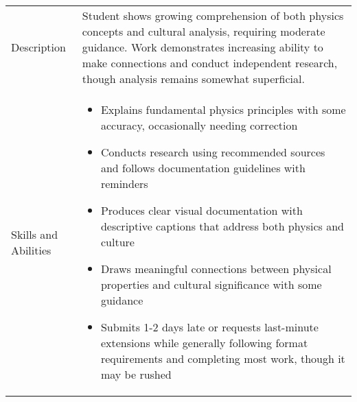 \documentclass[12pt]{article}
\begin{document}
\begin{table}[b]
\renewcommand{\arraystretch}{1.5}
\begin{tabular}{>{\raggedright\arraybackslash}p{2cm}|>{\raggedright\arraybackslash}p{14cm}}
\toprule
\multicolumn{2}{l}{\textbf{Developing}} \\
\midrule
Description & Student shows growing comprehension of both physics concepts and cultural analysis, requiring moderate guidance. Work demonstrates increasing ability to make connections and conduct independent research, though analysis remains somewhat superficial. \\
\midrule
Skills and Abilities & 
\begin{itemize}
    \item Explains fundamental physics principles with some accuracy, occasionally needing correction
    \item Conducts research using recommended sources and follows documentation guidelines with reminders
    \item Produces clear visual documentation with descriptive captions that address both physics and culture
    \item Draws meaningful connections between physical properties and cultural significance with some guidance
    \item Submits 1-2 days late or requests last-minute extensions while generally following format requirements and completing most work, though it may be rushed
\end{itemize} \\
\bottomrule
\end{tabular}
\end{table}

\clearpage %
\end{document}
